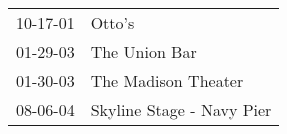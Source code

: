 \begin{supertabular}{p{0.07\textwidth}p{0.23\textwidth}}
 10-17-01 &                     Otto's \\
 01-29-03 &              The Union Bar \\
 01-30-03 &        The Madison Theater \\
 08-06-04 &  Skyline Stage - Navy Pier \\
\end{supertabular}
